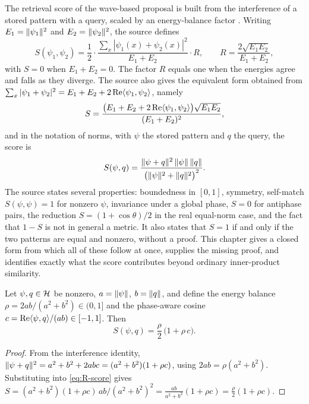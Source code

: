 The retrieval score of the wave-based proposal is built from the interference of a stored pattern with a query, scaled by an energy-balance factor \cite{listopad2025}. Writing $E_1=\lVert \psi_1\rVert^2$ and $E_2=\lVert \psi_2\rVert^2$, the source defines
\begin{equation}\label{eq:S-def}
S(\psi_1,\psi_2)=\frac12\cdot\frac{\sum_x|\psi_1(x)+\psi_2(x)|^2}{E_1+E_2}\cdot R,\qquad R=\frac{2\sqrt{E_1E_2}}{E_1+E_2},
\end{equation}
with $S=0$ when $E_1+E_2=0$. The factor $R$ equals one when the energies agree and falls as they diverge. The source also gives the equivalent form obtained from $\sum_x|\psi_1+\psi_2|^2=E_1+E_2+2\operatorname{Re}\langle \psi_1,\psi_2\rangle$, namely
\begin{equation}\label{eq:S-appendix}
S=\frac{\bigl(E_1+E_2+2\operatorname{Re}\langle \psi_1,\psi_2\rangle\bigr)\sqrt{E_1E_2}}{(E_1+E_2)^2},
\end{equation}
and in the notation of norms, with $\psi$ the stored pattern and $q$ the query, the score is
\begin{equation}\label{eq:R-score}
S(\psi,q)=\frac{\lVert \psi+q\rVert^2\,\lVert \psi\rVert\,\lVert q\rVert}{\bigl(\lVert \psi\rVert^2+\lVert q\rVert^2\bigr)^2}.
\end{equation}
The source states several properties: boundedness in $[0,1]$, symmetry, self-match $S(\psi,\psi)=1$ for nonzero $\psi$, invariance under a global phase, $S=0$ for antiphase pairs, the reduction $S=(1+\cos\theta)/2$ in the real equal-norm case, and the fact that $1-S$ is not in general a metric. It also states that $S=1$ if and only if the two patterns are equal and nonzero, without a proof. This chapter gives a closed form from which all of these follow at once, supplies the missing proof, and identifies exactly what the score contributes beyond ordinary inner-product similarity.

\begin{theorem}\label{thm:closed}
Let $\psi,q\in\mathcal{H}$ be nonzero, $a=\lVert \psi\rVert$, $b=\lVert q\rVert$, and define the energy balance $\rho=2ab/(a^2+b^2)\in(0,1]$ and the phase-aware cosine $c=\operatorname{Re}\langle \psi,q\rangle/(ab)\in[-1,1]$. Then
\begin{equation}\label{eq:closed}
S(\psi,q)=\frac{\rho}{2}\,\bigl(1+\rho\,c\bigr).
\end{equation}
\end{theorem}

\begin{proof}
From the interference identity, $\lVert \psi+q\rVert^2=a^2+b^2+2abc=(a^2+b^2)(1+\rho c)$, using $2ab=\rho(a^2+b^2)$. Substituting into \eqref{eq:R-score} gives $S=(a^2+b^2)(1+\rho c)\,ab/(a^2+b^2)^2=\frac{ab}{a^2+b^2}(1+\rho c)=\frac\rho2(1+\rho c)$.
\end{proof}

